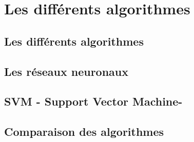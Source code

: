 \section{Les différents algorithmes}
\label{ILe Machine Learning: Les différents algorithmes}

\subsection{Les différents algorithmes}
\label{ILe Machine Learning: Les différents algorithmes: La regression logistique}

\subsection{Les réseaux neuronaux}
\label{ILe Machine Learning: Les différents algorithmes: Les réseaux neuronaux}

\subsection{SVM - Support Vector Machine-}
\label{ILe Machine Learning: Les différents algorithmes: SVM}

\subsection{Comparaison des algorithmes}
\label{ILe Machine Learning: Les différents algorithmes: Comparaison des algorithmes}